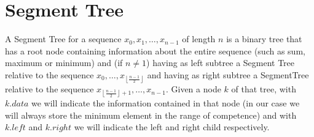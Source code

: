 \documentclass{article}
\begin{document}
\section{Segment Tree}
A Segment Tree for a sequence $x_0,x_1,\dots,x_{n-1}$ of length $n$ is a binary tree that has a root node containing information about the entire sequence (such as sum, maximum or minimum) and (if $n \neq 1$) having as left subtree a Segment Tree relative to the sequence $x_0,\dots,x_{\left\lfloor{\frac{n-1}{2}}\right\rfloor}$ and having as right subtree a SegmentTree relative to the sequence $x_{\left\lfloor{\frac{n-1}{2}}\right\rfloor+1},\dots,x_{n-1}$. Given a node $k$ of that tree, with $k.data$ we will indicate the information contained in that node (in our case we will always store the minimum element in the range of competence) and with $k.left$ and $k.right$ we will indicate the left and right child respectively.
    \begin{center}
        \captionsetup{type=figure, width=.76\linewidth}
    \end{center}
\end{document}
